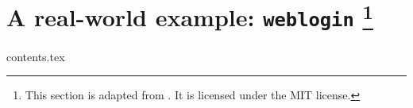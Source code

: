 \chapter{A real-world example: \texttt{weblogin}%
  \protected\footnote{This section is adapted from \cite{weblogin}.
                      It is licensed under the MIT license.}}
{contents.tex}

\printbibliography[heading=subbibintoc]
